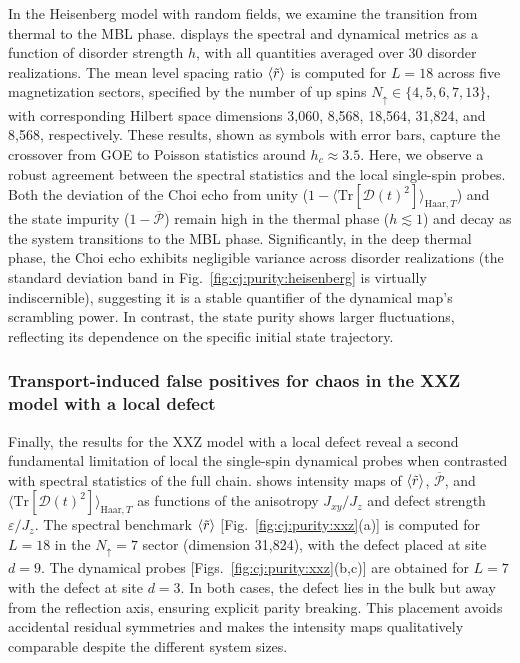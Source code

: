 \documentclass[pra,twocolumn,aps,showpacs,superscriptaddress,longbibliography]{revtex4-2}%
\newcommand{\choip}{\langle \text{Tr}[\mathcal{D}(t)^2] \rangle_{\mathrm{Haar}, T}} %
\newcommand{\statep}{\overline{\mathcal{P}}}
\newcommand{\mlsr}{\ev{\tilde{r}}}
\providecommand{\DIFadd}[1]{{\protect\color{blue} \sf #1}} %
\providecommand{\DIFdel}[1]{{\protect\color{red} \scriptsize #1}} %
\providecommand{\DIFaddbegin}{} %
\providecommand{\DIFaddend}{} %
\providecommand{\DIFdelbegin}{} %
\providecommand{\DIFdelend}{} %
\begin{document}
In the Heisenberg model with random fields, we examine the transition from thermal to the MBL phase.  displays the spectral and dynamical metrics as a function of disorder strength $h$, with all quantities averaged over 30 disorder realizations. The mean level spacing ratio $\mlsr$ is computed for $L=18$ across five magnetization sectors, specified by the number of up spins $N_{\uparrow} \in \{4, 5, 6, 7, 13\}$, with corresponding Hilbert space dimensions 3,060, 8,568, 18,564, 31,824, and 8,568, respectively. These results, shown as symbols with error bars, capture the crossover from GOE to Poisson statistics around $h_c \approx 3.5$. Here, we observe a robust agreement between the spectral statistics and the \DIFdelbegin \DIFdel{local }\DIFdelend \DIFaddbegin \DIFadd{single-spin }\DIFaddend probes. Both the deviation of the Choi echo from unity ($1-\choip$) and the state impurity ($1-\statep$) remain high in the thermal phase ($h \lesssim 1$) and decay as the system transitions to the MBL phase. Significantly, in the deep thermal phase, the Choi echo exhibits negligible variance across disorder realizations (the standard deviation band in Fig.~\ref{fig:cj:purity:heisenberg} is virtually indiscernible), suggesting it is a stable quantifier of the dynamical map's scrambling power. In contrast, the state purity shows larger fluctuations, reflecting its dependence on the specific initial state trajectory.

\subsubsection{Transport-induced false positives for chaos in the XXZ model with a local defect}\label{sec:results_xxz}

Finally, the results for the XXZ model with a local defect reveal a second fundamental limitation of \DIFdelbegin \DIFdel{local }\DIFdelend \DIFaddbegin \DIFadd{the single-spin }\DIFaddend dynamical probes when contrasted with spectral statistics of the full chain.  shows intensity maps of $\mlsr$, $\statep$, and $\choip$ as functions of the anisotropy $J_{xy}/J_z$ and defect strength $\varepsilon/J_z$. The spectral benchmark $\mlsr$ [Fig.~\ref{fig:cj:purity:xxz}(a)] is computed for $L=18$ in the $N_{\uparrow}=7$ sector (dimension 31,824), with the defect placed at site $d=9$. The dynamical probes [Figs.~\ref{fig:cj:purity:xxz}(b,c)] are obtained for $L=7$ with the defect at site $d=3$. In both cases, the defect lies in the bulk but away from the reflection axis, ensuring explicit parity breaking. This placement avoids accidental residual symmetries and makes the intensity maps qualitatively comparable despite the different system sizes.
\end{document}
